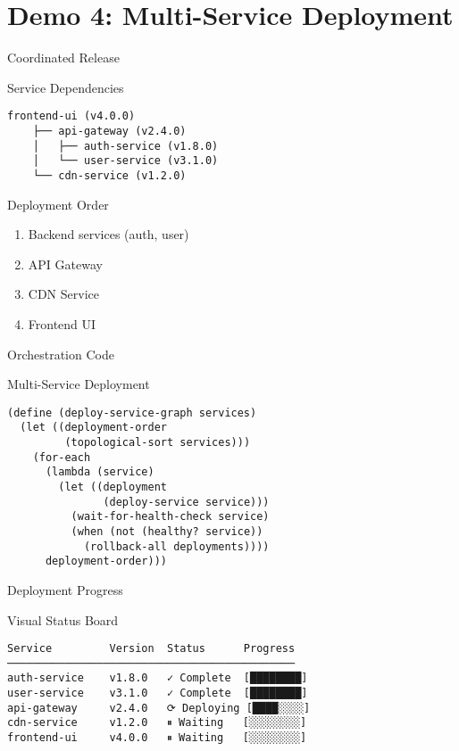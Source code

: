 \documentclass[presentation]{beamer}
\begin{document}
\section{Demo 4: Multi-Service Deployment}
\label{sec:orgebcb58c}
\begin{frame}[label={sec:org1be4d3b},fragile]{Coordinated Release}
 \begin{block}{Service Dependencies}
\begin{verbatim}
frontend-ui (v4.0.0)
    ├── api-gateway (v2.4.0)
    │   ├── auth-service (v1.8.0)
    │   └── user-service (v3.1.0)
    └── cdn-service (v1.2.0)
\end{verbatim}
\end{block}
\begin{block}{Deployment Order}
\begin{enumerate}
\item Backend services (auth, user)
\item API Gateway
\item CDN Service
\item Frontend UI
\end{enumerate}
\end{block}
\end{frame}
\begin{frame}[label={sec:orge6181bf},fragile]{Orchestration Code}
 \begin{block}{Multi-Service Deployment}
\begin{verbatim}
(define (deploy-service-graph services)
  (let ((deployment-order
         (topological-sort services)))
    (for-each
      (lambda (service)
        (let ((deployment
               (deploy-service service)))
          (wait-for-health-check service)
          (when (not (healthy? service))
            (rollback-all deployments))))
      deployment-order)))
\end{verbatim}
\end{block}
\end{frame}
\begin{frame}[label={sec:org8575142},fragile]{Deployment Progress}
 \begin{block}{Visual Status Board}
\begin{verbatim}
Service         Version  Status      Progress
─────────────────────────────────────────────
auth-service    v1.8.0   ✓ Complete  [████████]
user-service    v3.1.0   ✓ Complete  [████████]
api-gateway     v2.4.0   ⟳ Deploying [████░░░░]
cdn-service     v1.2.0   ⏸ Waiting   [░░░░░░░░]
frontend-ui     v4.0.0   ⏸ Waiting   [░░░░░░░░]
\end{verbatim}
\end{block}
\end{frame}
\end{document}
